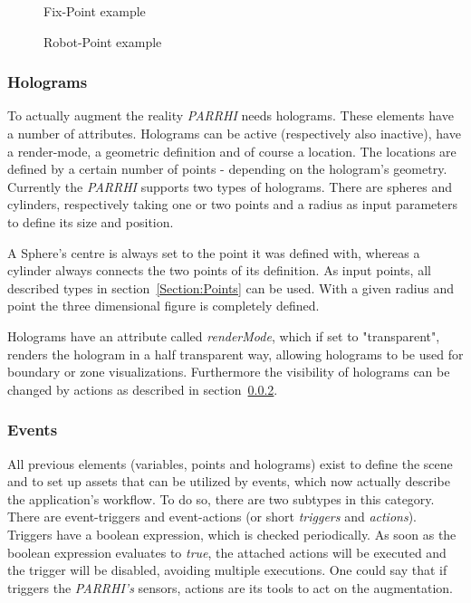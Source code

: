 \begin{figure}
	\begin{minipage}{0.45\textwidth}
		\centering
		
		\caption{Fix-Point example}
		\label{InputData:PointFix}
	\end{minipage}\hfill
	\begin{minipage}{0.45\textwidth}
		\centering
		
		\caption{Robot-Point example}
		\label{InputData:PointRobot}
	\end{minipage}
\end{figure}


\subsubsection{Holograms}\label{Section:Holograms}
To actually augment the reality \textit{PARRHI} needs holograms. These elements have a number of attributes. Holograms can be active (respectively also inactive), have a render-mode, a geometric definition and of course a location. The locations are defined by a certain number of points - depending on the hologram's geometry. Currently the \textit{PARRHI} supports two types of holograms. There are spheres and cylinders, respectively taking one or two points and a radius as input parameters to define its size and position.

A Sphere's centre is always set to the point it was defined with, whereas a cylinder always connects the two points of its definition. As input points, all described types in section~\ref{Section:Points} can be used. With a given radius and point the three dimensional figure is completely defined.

Holograms have an attribute called \textit{renderMode}, which if set to "transparent", renders the hologram in a half transparent way, allowing holograms to be used for boundary or zone visualizations. Furthermore the visibility of holograms can be changed by actions as described in section~\ref{Section:Events}.

\subsubsection{Events}\label{Section:Events}
All previous elements (variables, points and holograms) exist to define the scene and to set up assets that can be utilized by events, which now actually describe the application's workflow. To do so, there are two subtypes in this category. There are event-triggers and event-actions (or short \textit{triggers} and \textit{actions}). Triggers have a boolean expression, which is checked periodically. As soon as the boolean expression evaluates to \textit{true}, the attached actions will be executed and the trigger will be disabled, avoiding multiple executions. One could say that if triggers the \textit{PARRHI's} sensors, actions are its tools to act on the augmentation. 


